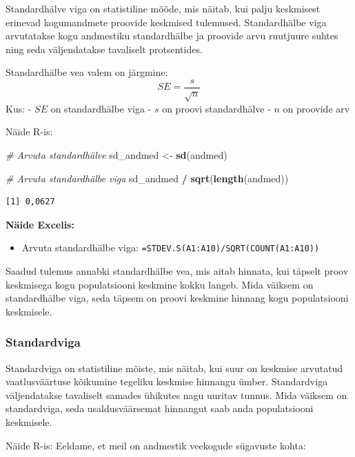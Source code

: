 \documentclass[
]{book}
\newenvironment{Shaded}{\begin{snugshade}}{\end{snugshade}}
\newcommand{\CommentTok}[1]{\textcolor[rgb]{0.56,0.35,0.01}{\textit{#1}}}
\newcommand{\FunctionTok}[1]{\textcolor[rgb]{0.13,0.29,0.53}{\textbf{#1}}}
\newcommand{\NormalTok}[1]{#1}
\newcommand{\OtherTok}[1]{\textcolor[rgb]{0.56,0.35,0.01}{#1}}
\newcommand{\SpecialCharTok}[1]{\textcolor[rgb]{0.81,0.36,0.00}{\textbf{#1}}}
\providecommand{\tightlist}{%
  \setlength{\itemsep}{0pt}\setlength{\parskip}{0pt}}
\renewenvironment{Shaded} {\begin{snugshade}\footnotesize} {\end{snugshade}}
\begin{document}
Standardhälve viga on statistiline mõõde, mis näitab, kui palju keskmisest erinevad kogumandmete proovide keskmised tulemused. Standardhälbe viga arvutatakse kogu andmestiku standardhälbe ja proovide arvu ruutjuure suhtes ning seda väljendatakse tavaliselt protsentides.

Standardhälbe vea valem on järgmine:
\[ SE = \frac{s}{\sqrt{n}}\]
Kus:
- \(SE\) on standardhälbe viga
- \(s\) on proovi standardhälve
- \(n\) on proovide arv

Näide R-is:

\begin{Shaded}
\begin{Highlighting}[]
\CommentTok{\# Arvuta standardhälve}
\NormalTok{sd\_andmed }\OtherTok{\textless{}{-}} \FunctionTok{sd}\NormalTok{(andmed)}

\CommentTok{\# Arvuta standardhälbe viga}
\NormalTok{sd\_andmed }\SpecialCharTok{/} \FunctionTok{sqrt}\NormalTok{(}\FunctionTok{length}\NormalTok{(andmed))}
\end{Highlighting}
\end{Shaded}

\begin{verbatim}
[1] 0,0627
\end{verbatim}

\textbf{Näide Excelis:}

\begin{itemize}
\tightlist
\item
  Arvuta standardhälbe viga: \texttt{=STDEV.S(A1:A10)/SQRT(COUNT(A1:A10))}
\end{itemize}

Saadud tulemus annabki standardhälbe vea, mis aitab hinnata, kui täpselt proov keskmisega kogu populatsiooni keskmine kokku langeb. Mida väiksem on standardhälbe viga, seda täpsem on proovi keskmine hinnang kogu populatsiooni keskmisele.

\subsubsection{Standardviga}\label{standardviga}

Standardviga on statistiline mõiste, mis näitab, kui suur on keskmise arvutatud vaatlusväärtuse kõikumine tegeliku keskmise hinnangu ümber. Standardviga väljendatakse tavaliselt samades ühikutes nagu uuritav tunnus. Mida väiksem on standardviga, seda usaldusväärsemat hinnangut saab anda populatsiooni keskmisele.

Näide R-is:
Eeldame, et meil on andmestik veekogude sügavuste kohta:
\end{document}

